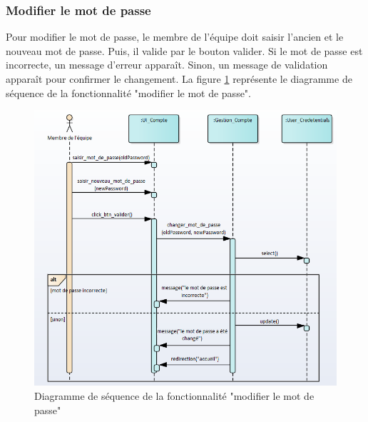 \subsubsection{Modifier le mot de passe}
Pour modifier le mot de passe, le membre de l'équipe doit saisir l'ancien et le nouveau mot de passe. Puis, il valide par le bouton valider. Si le mot de passe est incorrecte, un message d'erreur apparaît. Sinon, un message de validation apparaît pour confirmer le changement.
La figure \ref{code80} représente le diagramme de séquence de la fonctionnalité "modifier le mot de passe".
\begin{figure}[H]
  \centering
 \includegraphics[scale=0.69]{figures/diagrams/sequence/changepassword_seq_diag.png}
 \caption{Diagramme de séquence de la fonctionnalité "modifier le mot de passe"}
 \label{code80}
\end{figure}

